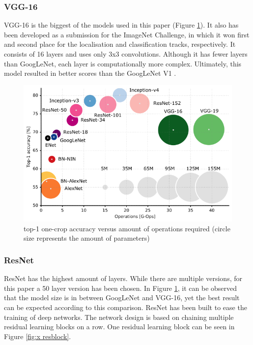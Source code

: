 \documentclass[conference]{IEEEtran}
\begin{document}
\subsubsection{VGG-16}
VGG-16 is the biggest of the models used in this paper (Figure \ref{fig:x mode size}).
It also has been developed as a submission for the ImageNet Challenge, in which it won first and second place for the localisation and classification tracks, respectively.
It consists of 16 layers and uses only 3x3 convolutions. Although it has fewer layers than GoogLeNet, each layer is computationally more complex. 
Ultimately, this model resulted in better scores than the GoogLeNet V1 \cite{simonyan_very_2015}.

\begin{figure}[!htbp]
    \centering
    \includegraphics[scale=0.35]{img/model_sizes.png}
    \caption{top-1 one-crop accuracy versus amount of operations required (circle size represents the amount of parameters) \cite{canziani_analysis_2017}}
    \label{fig:x mode size}
\end{figure}

\subsubsection{ResNet}
ResNet has the highest amount of layers. 
While there are multiple versions, for this paper a 50 layer version has been chosen.
In Figure \ref{fig:x mode size}, it can be observed that the model size is in between GoogLeNet and VGG-16, yet the best result can be expected according to this comparison.
ResNet has been built to ease the training of deep networks. The network design is based on chaining multiple residual learning blocks on a row. One residual learning block can be seen in Figure \ref{fig:x resblock}. \cite{he_deep_2015}
\end{document}
